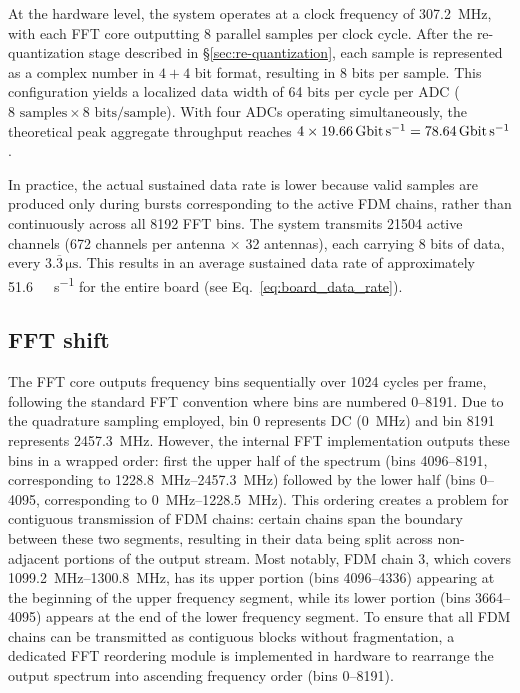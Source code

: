 At the hardware level, the system operates at a clock frequency of \SI{307.2}{\mega\hertz}, with each FFT core outputting 8 parallel samples per clock cycle. After the re-quantization stage described in \S\ref{sec:re-quantization}, each sample is represented as a complex number in $4+4$ bit format, resulting in 8 bits per sample. This configuration yields a localized data width of 64 bits per cycle per ADC ($8 \text{ samples} \times 8 \text{ bits/sample}$). With four ADCs operating simultaneously, the theoretical peak aggregate throughput reaches $4\times\SI{19.66}{\giga\bit\per\second}=\SI{78.64}{\giga\bit\per\second}$.

In practice, the actual sustained data rate is lower because valid samples are produced only during bursts corresponding to the active FDM chains, rather than continuously across all \num{8192} FFT bins. The system transmits \num{21504} active channels (\num{672} channels per antenna $\times$ 32 antennas), each carrying 8 bits of data, every $3.\overline{3}\,\unit{\micro\second}$. This results in an average sustained data rate of approximately \SI{51.6}{\giga\bit\per\second} for the entire board (see Eq.\ \ref{eq:board_data_rate}).

\subsection{FFT shift}
The FFT core outputs frequency bins sequentially over 1024 cycles per frame, following the standard FFT convention where bins are numbered \qtyrange{0}{8191}{}. Due to the quadrature sampling employed, bin 0 represents DC (\SI{0}{\mega\hertz}) and bin 8191 represents \SI{2457.3}{\mega\hertz}. However, the internal FFT implementation outputs these bins in a wrapped order: first the upper half of the spectrum (bins \qtyrange{4096}{8191}{}, corresponding to \qtyrange{1228.8}{2457.3}{\mega\hertz}) followed by the lower half (bins \qtyrange{0}{4095}{}, corresponding to \qtyrange{0}{1228.5}{\mega\hertz}). This ordering creates a problem for contiguous transmission of FDM chains: certain chains span the boundary between these two segments, resulting in their data being split across non-adjacent portions of the output stream. Most notably, FDM chain 3, which covers \qtyrange{1099.2}{1300.8}{\mega\hertz}, has its upper portion (bins \qtyrange{4096}{4336}{}) appearing at the beginning of the upper frequency segment, while its lower portion (bins \qtyrange{3664}{4095}{}) appears at the end of the lower frequency segment. To ensure that all FDM chains can be transmitted as contiguous blocks without fragmentation, a dedicated FFT reordering module is implemented in hardware to rearrange the output spectrum into ascending frequency order (bins \qtyrange{0}{8191}{}).

